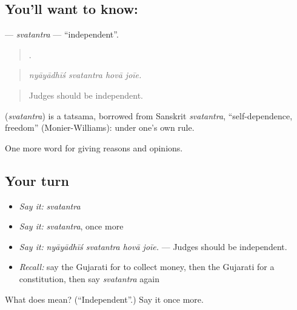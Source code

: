 \subsection*{You'll want to know: }
\textbf{} — \emph{svatantra} — \textquotedblleft{}independent\textquotedblright{}.

\begin{quote}
   .
\end{quote}

\begin{quote}
\emph{nyāyādhīś svatantra hovā joīe.}
\end{quote}

\begin{quote}
Judges should be independent.
\end{quote}

\begin{cousinweb}
\textbf{} (\emph{svatantra}) is a tatsama, borrowed from Sanskrit \emph{svatantra}, \textquotedblleft{}self-dependence, freedom\textquotedblright{} (Monier-Williams): under one's own rule.
\end{cousinweb}

\begin{grammarlens}[title={What you've built}]
One more word for giving reasons and opinions.
\end{grammarlens}

\subsection*{Your turn}
\begin{itemize}
\raggedright
  \item \emph{Say it:} \emph{svatantra}
  \item \emph{Say it:} \emph{svatantra}, once more
  \item \emph{Say it:} \emph{nyāyādhīś svatantra hovā joīe.} — Judges should be independent.
  \item \emph{Recall:} say the Gujarati for to collect money, then the Gujarati for a constitution, then say \emph{svatantra} again
\end{itemize}

\begin{tcolorbox}[breakable,colback=teal!4,colframe=teal!35!black,title={Before you move on}]
What does  mean? (\textquotedblleft{}Independent\textquotedblright{}.) Say it once more.
\end{tcolorbox}
